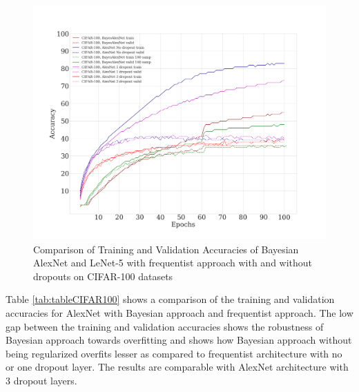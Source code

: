 \begin{figure}[H] 
\begin{center}
\includegraphics[width=\linewidth]{Chapter5/Figs/results_train_test_cifar100.png}
\caption{Comparison of Training and Validation Accuracies of Bayesian AlexNet and LeNet-5 with frequentist approach with and without dropouts on CIFAR-100 datasets}
\label{fig:regularization}
\end{center}
\end{figure} 

Table \ref{tab:tableCIFAR100} shows a comparison of the training and validation accuracies for AlexNet with Bayesian approach and frequentist approach. The low gap between the training and validation accuracies shows the robustness of Bayesian approach towards overfitting and shows how Bayesian approach without being regularized overfits lesser as compared to frequentist architecture with no or one dropout layer. The results are comparable with AlexNet architecture with 3 dropout layers.


